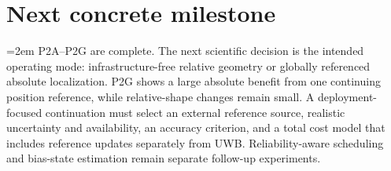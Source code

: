 \section{Next concrete milestone}
\begingroup
\emergencystretch=2em
P2A--P2G are complete. The next scientific decision is the intended operating mode: infrastructure-free relative geometry or globally referenced absolute localization. P2G shows a large absolute benefit from one continuing position reference, while relative-shape changes remain small. A deployment-focused continuation must select an external reference source, realistic uncertainty and availability, an accuracy criterion, and a total cost model that includes reference updates separately from UWB. Reliability-aware scheduling and bias-state estimation remain separate follow-up experiments.
\par
\endgroup
